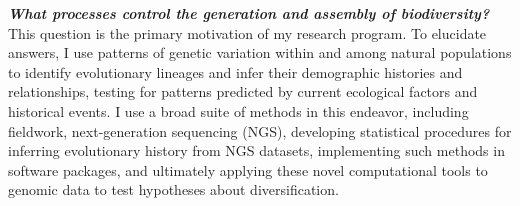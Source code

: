 \textbf{\textit{What processes control the generation and assembly of
        biodiversity?}}
This question is the primary motivation of my research program.
To elucidate answers, I use patterns of genetic variation within and among
natural populations to identify evolutionary lineages and infer their
demographic histories and relationships, testing for patterns predicted by
current ecological factors and historical events.  I use a broad suite of
methods in this endeavor, including
fieldwork,
next-generation sequencing (NGS),
developing statistical procedures for inferring evolutionary
history from NGS datasets,
implementing such methods in software packages,
and ultimately applying these novel computational tools to genomic data to test
hypotheses about diversification.
